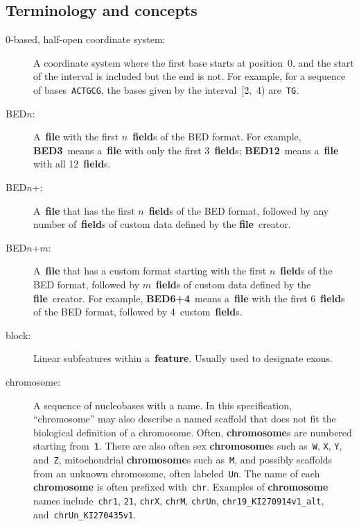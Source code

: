 \documentclass[11pt]{article}
\begin{document}
\subsection{Terminology and concepts}\label{sec:terms}
\begin{description}
\item[0-based, half-open coordinate system:]
  A coordinate system where the first base starts at position~0, and the start of the interval is included but the end is not.
  For example, for a sequence of bases~\texttt{ACTGCG}, the bases given by the interval~[2,~4) are~\texttt{TG}. %

\item[\acs{BED}$n$:]
  A~\textbf{file} with the first $n$~\textbf{field}s of the \ac{BED} format.
  For example, \textbf{BED3}~means a~\textbf{file} with only the first 3~\textbf{field}s; \textbf{BED12}~means a~\textbf{file} with all 12~\textbf{field}s.

\item[\acs{BED}$n$+:]
  A~\textbf{file} that has the first $n$~\textbf{field}s of the \ac{BED} format, followed by any number of~\textbf{field}s of custom data defined by the \textbf{file}~creator.

\item[\acs{BED}$n$+$m$:]
  A~\textbf{file} that has a custom format starting with the first $n$~\textbf{field}s of the \ac{BED} format, followed by $m$~\textbf{field}s of custom data defined by the \textbf{file}~creator.
  For example, \textbf{BED6+4}~means a~\textbf{file} with the first 6~\textbf{field}s of the \ac{BED} format, followed by 4~custom~\textbf{field}s.

\item[block:]
  Linear subfeatures within a~\textbf{feature}.
  Usually used to designate exons.

\item[chromosome:]
  A sequence of nucleobases with a name.
  In this specification, ``chromosome'' may also describe a named scaffold that does not fit the biological definition of a chromosome.
  Often, \textbf{chromosome}s are numbered starting from~\texttt{1}.
  There are also often sex \textbf{chromosome}s such as~\texttt{W}, \texttt{X}, \texttt{Y}, and~\texttt{Z}, mitochondrial \textbf{chromosome}s such as~\texttt{M}, and possibly scaffolds from an unknown chromosome, often labeled~\texttt{Un}.
  The name of each \textbf{chromosome} is often prefixed with~\texttt{chr}.
  Examples of \textbf{chromosome} names include~\texttt{chr1}, \texttt{21}, \texttt{chrX}, \texttt{chrM}, \texttt{chrUn}, \texttt{chr19\_KI270914v1\_alt}, and~\texttt{chrUn\_KI270435v1}.


\end{description}
\end{document}
